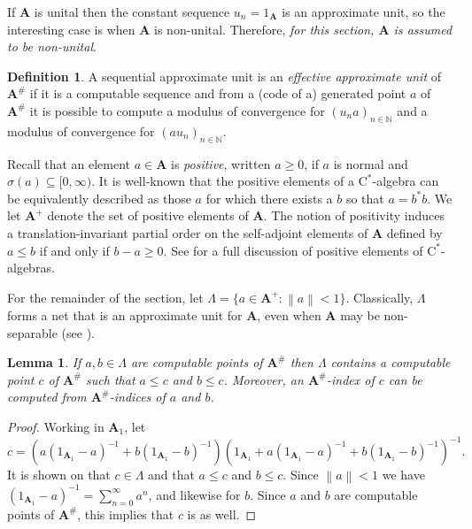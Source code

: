 \documentclass{amsart}
\newcommand{\norm}[1]{\left\| #1 \right\|}
\newcommand{\boldA}{\mathbf{A}}
\newcommand{\cstar}{$\mathrm{C}^*$}
\theoremstyle{plain}
\newtheorem{lemma}[theorem]{Lemma}
\theoremstyle{definition}
\newtheorem{definition}[theorem]{Definition}
\numberwithin{equation}{section}
\begin{document}
If $\boldA$ is unital then the constant sequence $u_n = 1_\boldA$ is an approximate unit, so the interesting case is when $\boldA$ is non-unital.  Therefore, \emph{for this section, $\boldA$ is assumed to be non-unital}. 

\begin{definition}
A sequential approximate unit is an \emph{effective approximate unit} of $\boldA^\#$ if it is a computable sequence and from a (code of a) generated point $a$ of $\boldA^\#$ it is possible to compute a modulus of convergence for $(u_na)_{n \in \mathbb{N}}$ and a modulus of convergence for $(au_n)_{n\in\mathbb{N}}$.
\end{definition}

Recall that an element $a \in \boldA$ is \emph{positive}, written $a \geq 0$, if $a$ is normal and $\sigma(a) \subseteq [0, \infty)$.  It is well-known that the positive elements of a \cstar-algebra can be equivalently described as those $a$ for which there exists a $b$ so that $a = b^*b$.  We let $\boldA^+$ denote the set of positive elements of $\boldA$.  The notion of positivity induces a translation-invariant partial order on the self-adjoint elements of $\boldA$ defined by $a \leq b$ if and only if $b - a \geq 0$.  See \cite[Section 2.2]{Murphy.1990} for a full discussion of positive elements of \cstar-algebras.

For the remainder of the section, let $\Lambda = \{a \in \boldA^+ : \norm{a} < 1\}$.  Classically, $\Lambda$ forms a net that is an approximate unit for $\boldA$, even when $\boldA$ may be non-separable (see \cite[Theorem 3.1.1]{Murphy.1990}).

\begin{lemma}\label{lemma:ComputableApproxUnitDirected}
If $a, b \in \Lambda$ are computable points of $\boldA^\#$ then $\Lambda$ contains a computable point $c$ of $\boldA^\#$ such that $a \leq c$ and $b \leq c$.  Moreover, an $\boldA^\#$-index of $c$ can be computed from $\boldA^\#$-indices of $a$ and $b$.
\end{lemma}
\begin{proof}
Working in $\boldA_1$, let
\[c = (a(1_{\boldA_1}-a)^{-1}+b(1_{\boldA_1}-b)^{-1})(1_{\boldA_1}+a(1_{\boldA_1}-a)^{-1}+b(1_{\boldA_1}-b)^{-1})^{-1}.\]
It is shown on \cite[Page 78]{Murphy.1990} that $c \in \Lambda$ and that $a \leq c$ and $b \leq c$.  Since $\norm{a} < 1$ we have $(1_{\boldA_1}-a)^{-1} = \sum_{n=0}^{\infty}a^n$, and likewise for $b$.  Since $a$ and $b$ are computable points of $\boldA^\#$, this implies that $c$ is as well.
\end{proof}
\end{document}
